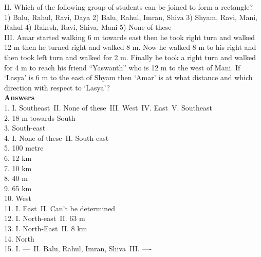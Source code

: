 \documentclass[
]{article}
\begin{document}
II. Which of the following group of students can be joined to form a rectangle?\\
1) Balu, Rahul, Ravi, Daya \hspace{2mm}2) Balu, Rahul, Imran, Shiva
\hspace{2mm}3) Shyam, Ravi, Mani, Rahul \hspace{2mm}4) Rakesh, Ravi, Shiva, Mani \hspace{2mm}5) None of these\\

III. Amar started walking 6 m towards east then he took right turn and walked 12 m then he
turned right and walked 8 m. Now he walked 8 m to his right and then took left turn and
walked for 2 m. Finally he took a right turn and walked for 4 m to reach his friend
“Yaswanth” who is 12 m to the west of Mani. If ‘Lasya’ is 6 m to the east of Shyam then
‘Amar’ is at what distance and which direction with respect to ‘Lasya’?\\

\textbf{Answers} \\
1. I. Southeast\, II. None of these\, III. West\, IV. East\, V. Southeast\\
2. 18 m towards South\\
3. South-east\\
4. I. None of these\, II. South-east\\
5. 100 metre\\
6. 12 km\\
7. 10 km\\
8. 40 m\\
9. 65 km\\
10. West\\
11. I. East\, II. Can't be determined\\
12. I. North-east\, II. 63 m\\
13. I. North-East\, II. 8 km\\
14. North\\
15. I. --- \,II. Balu, Rahul, Imran, Shiva \,III. ----\\
\end{document}
